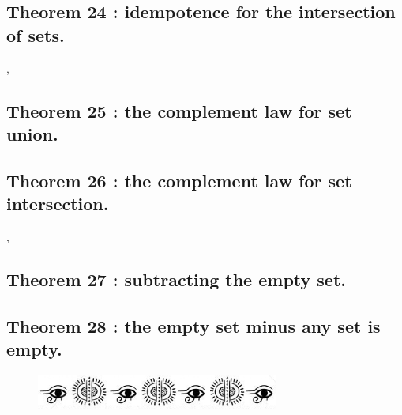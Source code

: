 \documentclass[preview]{standalone}
\begin{document}
\subsection[Idempotence for the intersection of sets.]
    {
        \color{section}Theorem 24 \color{black} : idempotence for the intersection of sets.
    }

\sep


\subsection[The complement law for set union.]
    {
        \color{section}Theorem 25 \color{black} : the complement law for set union.
    }

\pagebreak


\subsection[The complement law for set intersection.]
    {
        \color{section}Theorem 26 \color{black} : the complement law for set intersection.
    }

\sep


\subsection[Subtracting the empty set.]
    {
        \color{section}Theorem 27 \color{black} : subtracting the empty set.
    }

\pagebreak


\subsection[The empty set minus any set is empty.]
    {
        \color{section}Theorem 28 \color{black} : the empty set minus any set is empty.
    }

\vspace{2.9\baselineskip}
\begin{figure}[!h]
    \centering
    \includegraphics[width=8cm]{../resources/jpg/2.2.set.operations/border2.jpg}
\end{figure}
\vspace{2\baselineskip}
\end{document}
